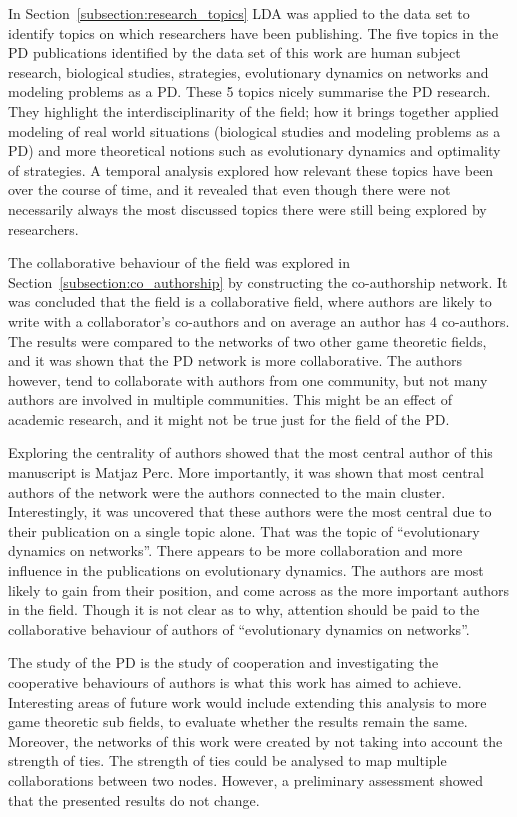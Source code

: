 \documentclass{article}
\theoremstyle{definition}
\begin{document}
In Section~\ref{subsection:research_topics} LDA was applied to the data set to
identify topics on which researchers have been publishing. The five topics in
the PD publications identified by the data set of this work are human subject
research, biological studies, strategies, evolutionary dynamics on networks and
modeling problems as a PD. These 5 topics nicely summarise the PD research. They
highlight the interdisciplinarity of the field; how it brings together applied
modeling of real world situations (biological studies and modeling problems as a
PD) and more theoretical notions such as evolutionary dynamics and optimality of
strategies. A temporal analysis explored how relevant these topics have been
over the course of time, and it revealed that even though there were not
necessarily always the most discussed topics there were still being explored
by researchers.

The collaborative behaviour of the field was explored in
Section~\ref{subsection:co_authorship} by constructing the co-authorship
network. It was concluded that the field is a collaborative field, where authors
are likely to write with a collaborator's co-authors and on average an author
has 4 co-authors. The results were compared to the networks of two other game
theoretic fields, and it was shown that the PD network is more collaborative. The
authors however, tend to collaborate with authors from one community, but not
many authors are involved in multiple communities. This might be an effect of
academic research, and it might not be true just for the field of the PD.

Exploring the centrality of authors showed that the most central author of this
manuscript is Matjaz Perc. More importantly, it was shown that most central
authors of the network were the authors connected to the main cluster.
Interestingly, it was uncovered that these authors were the most central due to
their publication on a single topic alone. That was the topic of “evolutionary
dynamics on networks”. There appears to be more collaboration and more influence
in the publications on evolutionary dynamics. The authors are most likely to
gain from their position, and come across as the more important authors in the
field. Though it is not clear as to why, attention should be paid to the
collaborative behaviour of authors of “evolutionary dynamics on networks”.

The study of the PD is the study of cooperation and investigating the
cooperative behaviours of authors is what this work has aimed to achieve.
Interesting areas of future work would include extending this analysis to more
game theoretic sub fields, to evaluate whether the results remain the same.
Moreover, the networks of this work were created by not taking into account the
strength of ties. The strength of ties could be analysed to map multiple
collaborations between two nodes. However, a preliminary assessment showed that
the presented results do not change.
\end{document}
